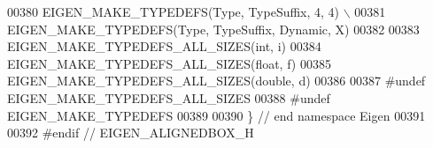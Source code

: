 \begin{DoxyCode}
00380 \textcolor{preprocessor}{EIGEN\_MAKE\_TYPEDEFS(Type, TypeSuffix, 4, 4) \(\backslash\)}
00381 \textcolor{preprocessor}{EIGEN\_MAKE\_TYPEDEFS(Type, TypeSuffix, Dynamic, X)}
00382 
00383 EIGEN\_MAKE\_TYPEDEFS\_ALL\_SIZES(\textcolor{keywordtype}{int},                  i)
00384 EIGEN\_MAKE\_TYPEDEFS\_ALL\_SIZES(\textcolor{keywordtype}{float},                f)
00385 EIGEN\_MAKE\_TYPEDEFS\_ALL\_SIZES(\textcolor{keywordtype}{double},               d)
00386 
00387 \textcolor{preprocessor}{#undef EIGEN\_MAKE\_TYPEDEFS\_ALL\_SIZES}
00388 \textcolor{preprocessor}{#undef EIGEN\_MAKE\_TYPEDEFS}
00389 
00390 \} \textcolor{comment}{// end namespace Eigen}
00391 
00392 \textcolor{preprocessor}{#endif // EIGEN\_ALIGNEDBOX\_H}
\end{DoxyCode}
